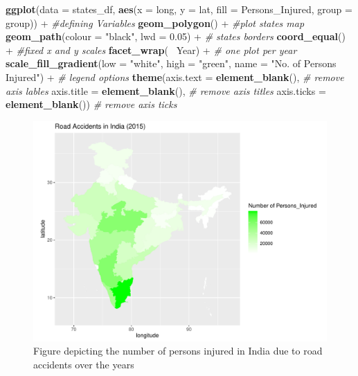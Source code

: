 \documentclass[]{article}
\newenvironment{Shaded}{}{}
\newcommand{\CommentTok}[1]{\textcolor[rgb]{0.38,0.63,0.69}{\textit{#1}}}
\newcommand{\DataTypeTok}[1]{\textcolor[rgb]{0.56,0.13,0.00}{#1}}
\newcommand{\FloatTok}[1]{\textcolor[rgb]{0.25,0.63,0.44}{#1}}
\newcommand{\KeywordTok}[1]{\textcolor[rgb]{0.00,0.44,0.13}{\textbf{#1}}}
\newcommand{\NormalTok}[1]{#1}
\newcommand{\OperatorTok}[1]{\textcolor[rgb]{0.40,0.40,0.40}{#1}}
\newcommand{\StringTok}[1]{\textcolor[rgb]{0.25,0.44,0.63}{#1}}
\begin{document}
\begin{Shaded}
\begin{Highlighting}[]
\KeywordTok{ggplot}\NormalTok{(}\DataTypeTok{data =}\NormalTok{ states_df,}
       \KeywordTok{aes}\NormalTok{(}\DataTypeTok{x =}\NormalTok{ long, }\DataTypeTok{y =}\NormalTok{ lat, }\DataTypeTok{fill =}\NormalTok{ Persons_Injured, }\DataTypeTok{group =}\NormalTok{ group)) }\OperatorTok{+}\StringTok{ }\CommentTok{#defining Variables}
\StringTok{  }\KeywordTok{geom_polygon}\NormalTok{() }\OperatorTok{+}\StringTok{ }\CommentTok{#plot states map}
\StringTok{  }\KeywordTok{geom_path}\NormalTok{(}\DataTypeTok{colour =} \StringTok{"black"}\NormalTok{, }\DataTypeTok{lwd =} \FloatTok{0.05}\NormalTok{) }\OperatorTok{+}\StringTok{ }\CommentTok{# states borders}
\StringTok{  }\KeywordTok{coord_equal}\NormalTok{() }\OperatorTok{+}\StringTok{ }\CommentTok{#fixed x and y scales}
\StringTok{  }\KeywordTok{facet_wrap}\NormalTok{(}\OperatorTok{~}\StringTok{ }\NormalTok{Year) }\OperatorTok{+}\StringTok{ }\CommentTok{# one plot per year}
\StringTok{  }\KeywordTok{scale_fill_gradient}\NormalTok{(}\DataTypeTok{low =} \StringTok{"white"}\NormalTok{, }\DataTypeTok{high =} \StringTok{"green"}\NormalTok{,}
                      \DataTypeTok{name =} \StringTok{"No. of Persons Injured"}\NormalTok{) }\OperatorTok{+}\StringTok{ }\CommentTok{# legend options}
\StringTok{  }\KeywordTok{theme}\NormalTok{(}\DataTypeTok{axis.text =} \KeywordTok{element_blank}\NormalTok{(), }\CommentTok{# remove axis lables}
        \DataTypeTok{axis.title =} \KeywordTok{element_blank}\NormalTok{(), }\CommentTok{# remove axis titles}
        \DataTypeTok{axis.ticks =} \KeywordTok{element_blank}\NormalTok{()) }\CommentTok{# remove axis ticks}
\end{Highlighting}
\end{Shaded}

\begin{figure}
\centering
\includegraphics{TutorialNotebook_files/figure-latex/unnamed-chunk-24-1.pdf}
\caption{Figure depicting the number of persons injured in India due to
road accidents over the years}
\end{figure}
\end{document}
